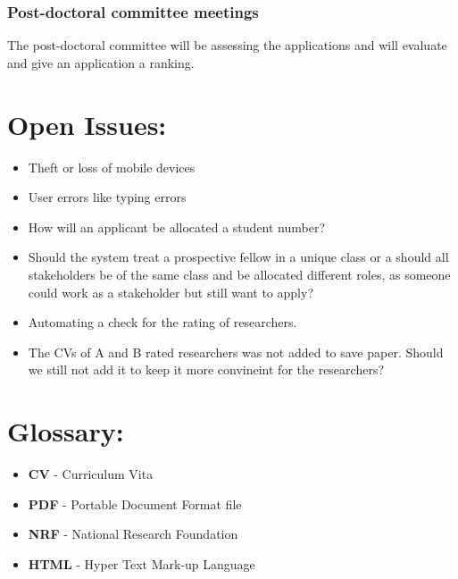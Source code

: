 \documentclass[12pt]{article}
\begin{document}
		\subsubsection{Post-doctoral committee meetings}
		The post-doctoral committee will be assessing the applications and will evaluate and give an application a ranking.
		
	\newpage	
	\section{Open Issues:} %
	\vspace{0.2in}
	
	\begin{itemize}
		\item Theft or loss of mobile devices
		\item User errors like typing errors
		\item How will an applicant be allocated a student number?
		\item Should the system treat a prospective fellow in a unique class or a should all stakeholders be of the same class and be allocated different roles, as someone could work as a stakeholder but still want to apply?
		\item Automating a check for the rating of researchers.
		\item The CVs of A and B rated researchers was not added to save paper. Should we still not add it to keep it more convineint for the researchers?
	\end{itemize}
	
	
	\vspace{0.5in}
	
	\newpage
	\section{Glossary:} %
	\vspace{0.2in}
	
	\begin{itemize}
		
		
		\item \textbf{CV} - Curriculum Vita
		\item \textbf{PDF} - Portable Document Format file
		\item \textbf{NRF} - National Research Foundation 
		\item \textbf{HTML} - Hyper Text Mark-up Language
		 
	\end{itemize}	
		
	
	\vspace{0.5in}
		
\end{document}
